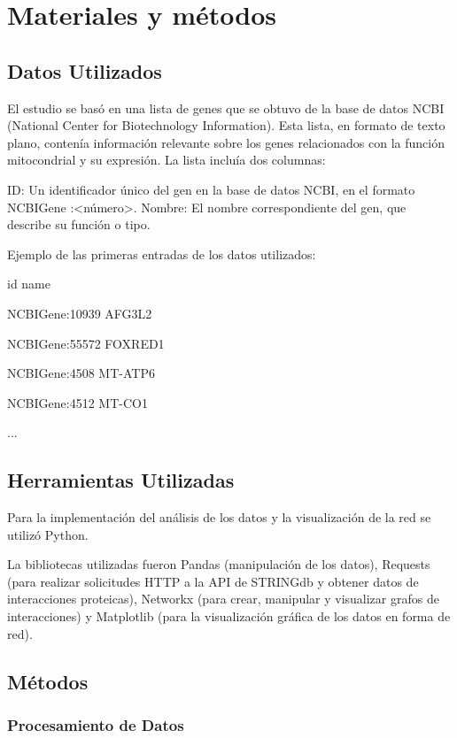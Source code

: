 \section{Materiales y métodos}


\subsection{\textbf{Datos Utilizados}}

El estudio se basó en una lista de genes que se obtuvo de la base de datos NCBI (National Center for Biotechnology Information). Esta lista, en formato de texto plano, contenía información relevante sobre los genes relacionados con la función mitocondrial y su expresión. La lista incluía dos columnas:

ID: Un identificador único del gen en la base de datos NCBI, en el formato NCBIGene :<número>.
Nombre: El nombre correspondiente del gen, que describe su función o tipo.

Ejemplo de las primeras entradas de los datos utilizados:

id                  name

NCBIGene:10939      AFG3L2

NCBIGene:55572      FOXRED1

NCBIGene:4508       MT-ATP6

NCBIGene:4512       MT-CO1

...


\subsection{\textbf{Herramientas Utilizadas}}

Para la implementación del análisis de los datos y la visualización de la red se utilizó Python.

La bibliotecas utilizadas fueron Pandas (manipulación de los datos), Requests (para realizar solicitudes HTTP a la API de STRINGdb y obtener datos de interacciones proteicas), Networkx (para crear, manipular y visualizar grafos de interacciones) y Matplotlib (para la visualización gráfica de los datos en forma de red).



\subsection{\textbf{Métodos}}


\subsubsection{\textbf{Procesamiento de Datos}}

